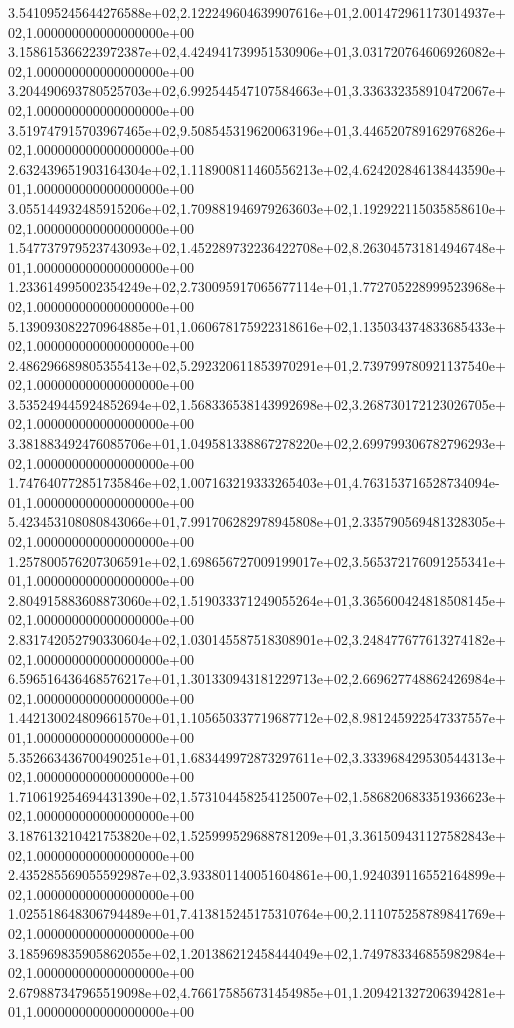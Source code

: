 3.541095245644276588e+02,2.122249604639907616e+01,2.001472961173014937e+02,1.000000000000000000e+00
3.158615366223972387e+02,4.424941739951530906e+01,3.031720764606926082e+02,1.000000000000000000e+00
3.204490693780525703e+02,6.992544547107584663e+01,3.336332358910472067e+02,1.000000000000000000e+00
3.519747915703967465e+02,9.508545319620063196e+01,3.446520789162976826e+02,1.000000000000000000e+00
2.632439651903164304e+02,1.118900811460556213e+02,4.624202846138443590e+01,1.000000000000000000e+00
3.055144932485915206e+02,1.709881946979263603e+02,1.192922115035858610e+02,1.000000000000000000e+00
1.547737979523743093e+02,1.452289732236422708e+02,8.263045731814946748e+01,1.000000000000000000e+00
1.233614995002354249e+02,2.730095917065677114e+01,1.772705228999523968e+02,1.000000000000000000e+00
5.139093082270964885e+01,1.060678175922318616e+02,1.135034374833685433e+02,1.000000000000000000e+00
2.486296689805355413e+02,5.292320611853970291e+01,2.739799780921137540e+02,1.000000000000000000e+00
3.535249445924852694e+02,1.568336538143992698e+02,3.268730172123026705e+02,1.000000000000000000e+00
3.381883492476085706e+01,1.049581338867278220e+02,2.699799306782796293e+02,1.000000000000000000e+00
1.747640772851735846e+02,1.007163219333265403e+01,4.763153716528734094e-01,1.000000000000000000e+00
5.423453108080843066e+01,7.991706282978945808e+01,2.335790569481328305e+02,1.000000000000000000e+00
1.257800576207306591e+02,1.698656727009199017e+02,3.565372176091255341e+01,1.000000000000000000e+00
2.804915883608873060e+02,1.519033371249055264e+01,3.365600424818508145e+02,1.000000000000000000e+00
2.831742052790330604e+02,1.030145587518308901e+02,3.248477677613274182e+02,1.000000000000000000e+00
6.596516436468576217e+01,1.301330943181229713e+02,2.669627748862426984e+02,1.000000000000000000e+00
1.442130024809661570e+01,1.105650337719687712e+02,8.981245922547337557e+01,1.000000000000000000e+00
5.352663436700490251e+01,1.683449972873297611e+02,3.333968429530544313e+02,1.000000000000000000e+00
1.710619254694431390e+02,1.573104458254125007e+02,1.586820683351936623e+02,1.000000000000000000e+00
3.187613210421753820e+02,1.525999529688781209e+01,3.361509431127582843e+02,1.000000000000000000e+00
2.435285569055592987e+02,3.933801140051604861e+00,1.924039116552164899e+02,1.000000000000000000e+00
1.025518648306794489e+01,7.413815245175310764e+00,2.111075258789841769e+02,1.000000000000000000e+00
3.185969835905862055e+02,1.201386212458444049e+02,1.749783346855982984e+02,1.000000000000000000e+00
2.679887347965519098e+02,4.766175856731454985e+01,1.209421327206394281e+01,1.000000000000000000e+00
